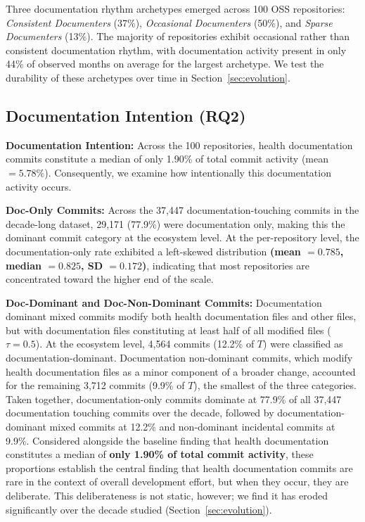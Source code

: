 \documentclass[10pt,conference]{IEEEtran}
\begin{document}
{{\begin{tcolorbox}[
  colback=heatmaplight,
  colframe=heatmapdark,
  coltitle=white,
  fonttitle=\bfseries,
  title=Summary — RQ1
]
Three documentation rhythm archetypes emerged across
100 OSS repositories: \textit{Consistent Documenters}
(37\%), \textit{Occasional Documenters} (50\%), and
\textit{Sparse Documenters} (13\%). The majority of
repositories exhibit occasional rather than consistent
documentation rhythm, with documentation activity present in only 44\% of observed months on average for the largest archetype. We test the durability of these archetypes over time in Section~\ref{sec:evolution}.

\end{tcolorbox}

\subsection{Documentation Intention (RQ2)}

\textbf{Documentation Intention:}
\label{sec:Documentation_Intention}
Across the 100 repositories, health documentation commits constitute a median of only 1.90\% of total commit activity
(mean $= 5.78\%$).
Consequently, we examine how intentionally this documentation activity occurs.

\textbf{Doc-Only Commits:}
Across the 37,447 documentation-touching commits in the decade-long dataset, 29,171 (77.9\%) were documentation only, making this the dominant commit category at the ecosystem level.
At the per-repository level, the documentation-only rate exhibited a left-skewed distribution \textbf{(mean $= 0.785$, median $= 0.825$, SD $= 0.172$)}, indicating that most repositories are concentrated toward the higher end  of the scale.

\textbf{Doc-Dominant and Doc-Non-Dominant Commits:}
Documentation dominant mixed commits modify both health documentation files and other files, but with documentation files constituting at least half of all modified files ($\tau = 0.5$). At the ecosystem level, 4,564 commits (12.2\% of $T$) were classified as documentation-dominant. Documentation non-dominant commits, which modify health documentation files as a minor component of a broader change, accounted for the remaining 3,712 commits (9.9\% of $T$), the smallest of the three categories.
Taken together, documentation-only commits dominate at 77.9\% of all 37,447 documentation touching commits over the decade, followed by documentation-dominant
mixed commits at 12.2\% and non-dominant incidental commits at 9.9\%. Considered alongside the baseline finding that health documentation constitutes a median of \textbf{only 1.90\% of total commit activity}, these proportions establish the central finding that health documentation commits are rare in the context of overall development effort, but when they occur, they are deliberate.
This deliberateness is not static, however; we find it has eroded significantly over the decade studied (Section~\ref{sec:evolution}).

}}
\end{document}
